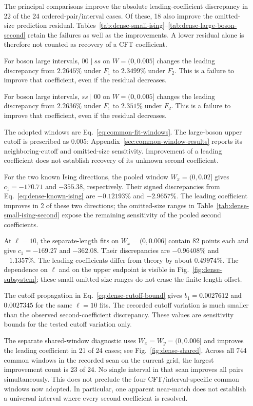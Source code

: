 The principal comparisons improve the absolute leading-coefficient discrepancy in 22 of the 24 ordered-pair/interval cases. Of these, 18 also improve the omitted-size prediction residual. Tables~\ref{tab:dense-small-ising}--\ref{tab:dense-large-boson-second} retain the failures as well as the improvements. A lower residual alone is therefore not counted as recovery of a CFT coefficient.

For boson large intervals, $00\mid ss$ on $W=(0,0.005]$ changes the leading discrepancy from $2.2645\%$ under $F_1$ to $2.3499\%$ under $F_2$. This is a failure to improve that coefficient, even if the residual decreases.

For boson large intervals, $ss\mid 00$ on $W=(0,0.005]$ changes the leading discrepancy from $2.2636\%$ under $F_1$ to $2.351\%$ under $F_2$. This is a failure to improve that coefficient, even if the residual decreases.

The adopted windows are Eq.~\eqref{eq:common-fit-windows}. The large-boson upper cutoff is prescribed as $0.005$: Appendix~\ref{sec:common-window-results} reports its neighboring-cutoff and omitted-size sensitivity. Improvement of a leading coefficient does not establish recovery of its unknown second coefficient.

For the two known Ising directions, the pooled window $W_x=(0,0.02]$ gives $c_1=-170.71$ and $-355.38$, respectively. Their signed discrepancies from Eq.~\eqref{eq:dense-known-ising} are $-0.12193\%$ and $-2.9657\%$. The leading coefficient improves in 2 of these two directions; the omitted-size ranges in Table~\ref{tab:dense-small-ising-second} expose the remaining sensitivity of the pooled second coefficients.

At $\ell=10$, the separate-length fits on $W_x=(0,0.006]$ contain 82 points each and give $c_1=-169.27$ and $-362.08$. Their discrepancies are $-0.96408\%$ and $-1.1357\%$. The leading coefficients differ from theory by about $0.49974\%$. The dependence on $\ell$ and on the upper endpoint is visible in Fig.~\ref{fig:dense-subsystem}; these small omitted-size ranges do not erase the finite-length offset.

The cutoff propagation in Eq.~\eqref{eq:dense-cutoff-bound} gives $b_1=0.0027612$ and $0.0027345$ for the same $\ell=10$ fits. The recorded cutoff variation is much smaller than the observed second-coefficient discrepancy. These values are sensitivity bounds for the tested cutoff variation only.

The separate shared-window diagnostic uses $W_x=W_y=(0,0.006]$ and improves the leading coefficient in 21 of 24 cases; see Fig.~\ref{fig:dense-shared}. Across all 744 common windows in the recorded scan on the current grid, the largest improvement count is 23 of 24. No single interval in that scan improves all pairs simultaneously. This does not preclude the four CFT/interval-specific common windows now adopted. In particular, one apparent near-match does not establish a universal interval where every second coefficient is resolved.

